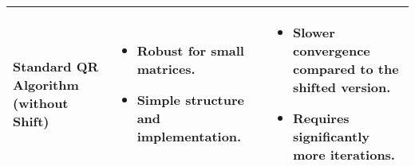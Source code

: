 \begin{tabular}{|p{3cm}|p{4.5cm}|p{7.5cm}|}
\textbf{Standard QR Algorithm (without Shift)}
& 
\begin{itemize}
    \item Robust for small matrices.
    \item Simple structure and implementation.
\end{itemize}
& 
\begin{itemize}
    \item Slower convergence compared to the shifted version.
    \item Requires significantly more iterations.
\end{itemize} \\\hline
\end{tabular}